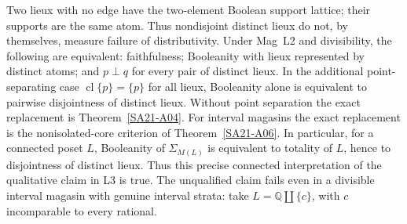 \begin{counterexample}
\label{SA21-A15}
Two lieux with no edge have the two-element Boolean support lattice;
their supports are the same atom. Thus nondisjoint distinct lieux do
not, by themselves, measure failure of distributivity. Under Mag~L2
and divisibility, the following are equivalent: faithfulness;
Booleanity with lieux represented by distinct atoms; and
$p\perp q$ for every pair of distinct lieux. In the additional
point-separating case $\operatorname{cl}\{p\}=\{p\}$ for all lieux,
Booleanity alone is equivalent to pairwise disjointness of distinct
lieux. Without point separation the exact replacement is
Theorem~\ref{SA21-A04}.
For interval magasins the exact replacement is the nonisolated-core
criterion of Theorem~\ref{SA21-A06}. In particular, for a connected
poset $L$, Booleanity of $\Sigma_{M(L)}$ is equivalent to totality
of $L$, hence to disjointness of distinct lieux. Thus this precise
connected interpretation of the qualitative claim in L3 is true.
The unqualified claim fails even in a divisible interval magasin
with genuine interval strata: take $L=\mathbb Q\amalg\{c\}$,
with $c$ incomparable to every rational.
\end{counterexample}
